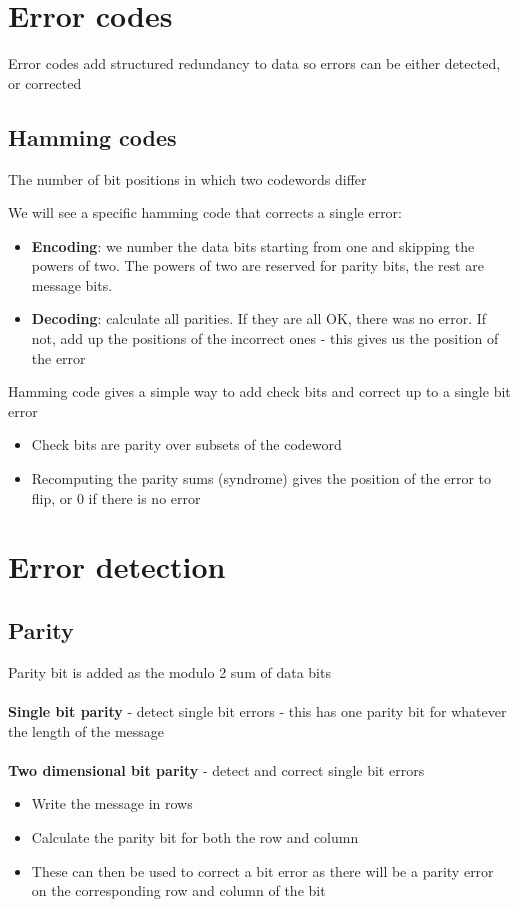 \documentclass{article}[18pt]
\begin{document}
\section{Error codes}
Error codes add structured redundancy to data so errors can be either detected, or corrected

\subsection{Hamming codes}
\begin{defin}
The number of bit positions in which two codewords differ
\end{defin}
We will see a specific hamming code that corrects a single error:
\begin{itemize}
	\item \textbf{Encoding}: we number the data bits starting from one and skipping the powers of two. The powers of two are reserved for parity bits, the rest are message bits.
	\item \textbf{Decoding}: calculate all parities. If they are all OK, there was no error. If not, add up the positions of the incorrect ones - this gives us the position of the error
\end{itemize}
Hamming code gives a simple way to add check bits and correct up to a single bit error
\begin{itemize}
	\item Check bits are parity over subsets of the codeword
	\item Recomputing the parity sums (syndrome) gives the position of the error to flip, or 0 if there is no error
\end{itemize}
\section{Error detection}
\subsection{Parity}
Parity bit is added as the modulo 2 sum of data bits\\
\\
\textbf{Single bit parity} - detect single bit errors - this has one parity bit for whatever the length of the message\\
\\
\textbf{Two dimensional bit parity} - detect and correct single bit errors
\begin{itemize}
	\item Write the message in rows
	\item Calculate the parity bit for both the row and column
	\item These can then be used to correct a bit error as there will be a parity error on the corresponding row and column of the bit
\end{itemize}
\end{document}
